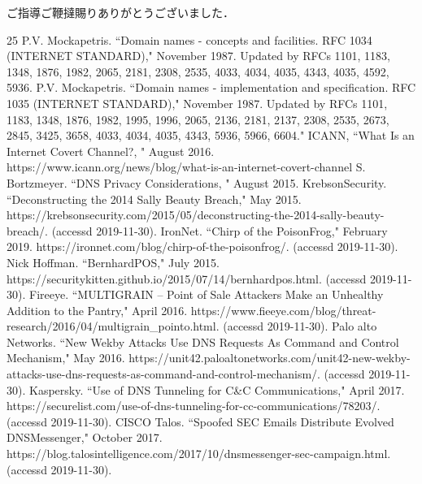 \documentclass[12pt]{jarticle} %
\begin{document}
\newpage
\acknowledgements
ご指導ご鞭撻賜りありがとうございました．




\newpage
%
\begin{thebibliography} {25}\small
  P.V. Mockapetris. ``Domain names - concepts and facilities. RFC 1034 (INTERNET STANDARD)," November 1987. Updated by RFCs 1101, 1183, 1348, 1876, 1982, 2065, 2181, 2308, 2535, 4033, 4034, 4035, 4343, 4035, 4592, 5936.
  P.V. Mockapetris. ``Domain names - implementation and specification. RFC 1035 (INTERNET STANDARD)," November 1987. Updated by RFCs 1101, 1183, 1348, 1876, 1982, 1995, 1996, 2065, 2136, 2181, 2137, 2308, 2535, 2673, 2845, 3425, 3658, 4033, 4034, 4035, 4343, 5936, 5966, 6604."
  ICANN, ``What Is an Internet Covert Channel?, " August 2016. https://www.icann.org/news/blog/what-is-an-internet-covert-channel
  S. Bortzmeyer. ``DNS Privacy Considerations, " August 2015.
  KrebsonSecurity. ``Deconstructing the 2014 Sally Beauty Breach," May 2015. https://krebsonsecurity.com/2015/05/deconstructing-the-2014-sally-beauty-breach/. (accessd 2019-11-30).
  IronNet. ``Chirp of the PoisonFrog," February 2019. https://ironnet.com/blog/chirp-of-the-poisonfrog/. (accessd 2019-11-30).
  Nick Hoffman. ``BernhardPOS," July 2015. https://securitykitten.github.io/2015/07/14/bernhardpos.html. (accessd 2019-11-30).
  Fireeye. ``MULTIGRAIN – Point of Sale Attackers Make an Unhealthy Addition to the Pantry," April 2016. https://www.fieeye.com/blog/threat-research/2016/04/multigrain\_pointo.html. (accessd 2019-11-30).
  Palo alto Networks. ``New Wekby Attacks Use DNS Requests As Command and Control Mechanism," May 2016. https://unit42.paloaltonetworks.com/unit42-new-wekby-attacks-use-dns-requests-as-command-and-control-mechanism/. (accessd 2019-11-30).
  Kaspersky. ``Use of DNS Tunneling for C\&C Communications," April 2017. https://securelist.com/use-of-dns-tunneling-for-cc-communications/78203/. (accessd 2019-11-30).
  CISCO Talos. ``Spoofed SEC Emails Distribute Evolved DNSMessenger," October 2017. https://blog.talosintelligence.com/2017/10/dnsmessenger-sec-campaign.html. (accessd 2019-11-30).

\end{thebibliography}
\end{document}

